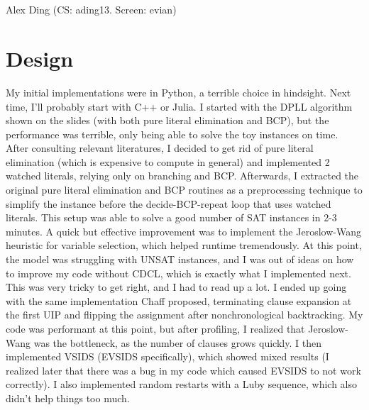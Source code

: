 \documentclass[10pt]{article}
\theoremstyle{definition} %
\begin{document}
\begin{center}
  \Large{} \\
  \normalsize{} \\
  \normalsize{Alex Ding (CS: ading13. Screen: evian)} \\
  \vspace{5pt}
\end{center}

\section{Design}

My initial implementations were in Python, a terrible choice in hindsight. Next time, I'll probably start with C++ or Julia. I started with the DPLL algorithm shown on the slides (with both pure literal elimination and BCP), but the performance was terrible, only being able to solve the toy instances on time. After consulting relevant literatures, I decided to get rid of pure literal elimination (which is expensive to compute in general) and implemented 2 watched literals, relying only on branching and BCP. Afterwards, I extracted the original pure literal elimination and BCP routines as a preprocessing technique to simplify the instance before the decide-BCP-repeat loop that uses watched literals. This setup was able to solve a good number of SAT instances in 2-3 minutes. A quick but effective improvement was to implement the Jeroslow-Wang heuristic for variable selection, which helped runtime tremendously. At this point, the model was struggling with UNSAT instances, and I was out of ideas on how to improve my code without CDCL, which is exactly what I implemented next. This was very tricky to get right, and I had to read up a lot. I ended up going with the same implementation Chaff proposed, terminating clause expansion at the first UIP and flipping the assignment after nonchronological backtracking. My code was performant at this point, but after profiling, I realized that Jeroslow-Wang was the bottleneck, as the number of clauses grows quickly. I then implemented VSIDS (EVSIDS specifically), which showed mixed results (I realized later that there was a bug in my code which caused EVSIDS to not work correctly). I also implemented random restarts with a Luby sequence, which also didn't help things too much. 
\end{document}
